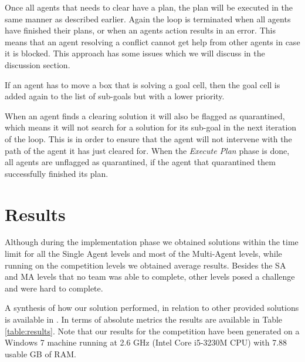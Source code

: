 \documentclass[letterpaper]{article}
\begin{document}
Once all agents that needs to clear have a plan, the plan will be executed in the same manner as described earlier. Again the loop is terminated when all agents have finished their plans, or when an agents action results in an error. This means that an agent resolving a conflict cannot get help from other agents in case it is blocked. This approach has some issues which we will discuss in the discussion section.

If an agent has to move a box that is solving a goal cell, then the goal cell is added again to the list of sub-goals but with a lower priority.

When an agent finds a clearing solution it will also be flagged as quarantined, which means it will not search for a solution for its sub-goal in the next iteration of the loop. This is in order to ensure that the agent will not intervene with the path of the agent it has just cleared for. When the \textit{Execute Plan} phase is done, all agents are unflagged as quarantined, if the agent that quarantined them successfully finished its plan. 


\section{Results}
Although during the implementation phase we obtained solutions within the time limit for all the Single Agent levels and most of the Multi-Agent levels, while running on the competition levels we obtained average results. Besides the SA and MA levels that no team was able to complete, other levels posed a challenge and were hard to complete.

A synthesis of how our solution performed, in relation to other provided solutions is available in \cite{compResults}. In terms of absolute metrics the results are available in Table \ref{table:results}. Note that our results for the competition have been generated on a Windows 7 machine running at 2.6 GHz (Intel Core i5-3230M CPU) with 7.88 usable GB of RAM.
\end{document}
